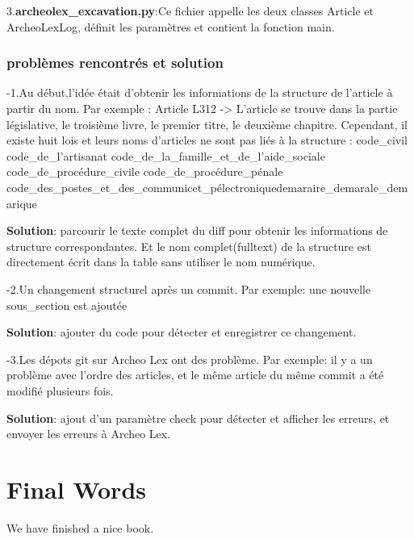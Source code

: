 \documentclass[
  oneside]{book}
\begin{document}
3.\textbf{archeolex\_excavation.py}:Ce fichier appelle les deux classes Article et ArcheoLexLog, définit les paramètres et contient la fonction main.

\hypertarget{probluxe8mes-rencontruxe9s-et-solution}{%
\subsection{problèmes rencontrés et solution}\label{probluxe8mes-rencontruxe9s-et-solution}}

-1.Au début,l'idée était d'obtenir les informations de la structure de l'article à partir du nom. Par exemple : Article L312 -\textgreater{} L'article se trouve dans la partie législative, le troisième livre, le premier titre, le deuxième chapitre.
Cependant, il existe huit lois et leurs noms d'articles ne sont pas liés à la structure : code\_civil code\_de\_l'artisanat code\_de\_la\_famille\_et\_de\_l'aide\_sociale code\_de\_procédure\_civile code\_de\_procédure\_pénale code\_des\_postes\_et\_des\_communicet\_pélectroniquedemaraire\_demarale\_demarique

\textbf{Solution}: parcourir le texte complet du diff pour obtenir les informations de structure correspondantes. Et le nom complet(fulltext) de la structure est directement écrit dans la table sans utiliser le nom numérique.

-2.Un changement structurel après un commit. Par exemple: une nouvelle sous\_section est ajoutée

\textbf{Solution}: ajouter du code pour détecter et enregistrer ce changement.

-3.Les dépots git sur Archeo Lex ont des problème. Par exemple: il y a un problème avec l'ordre des articles, et le même article du même commit a été modifié plusieurs fois.

\textbf{Solution}: ajout d'un paramètre check pour détecter et afficher les erreurs, et envoyer les erreurs à Archeo Lex.

\hypertarget{final-words}{%
\chapter{Final Words}\label{final-words}}

We have finished a nice book.

  
\end{document}
